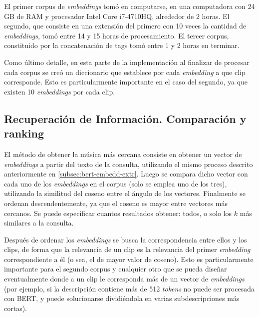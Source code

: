 El primer corpus de \textit{embeddings} tomó en computarse, en una computadora con 24 GB de RAM y procesador Intel Core i7-4710HQ, alrededor de 2 horas. El segundo, que consiste en una extensión del primero con 10 veces la cantidad de \textit{embeddings}, tomó entre 14 y 15 horas de procesamiento. El tercer corpus, constituido por la concatenación de tags tomó entre 1 y 2 horas en terminar.

Como último detalle, en esta parte de la implementación al finalizar de procesar cada corpus se creó un diccionario que establece por cada \textit{embedding} a que clip corresponde. Esto es particularmente importante en el caso del segundo, ya que existen 10 \textit{embeddings} por cada clip.

\subsection{Recuperación de Información. Comparación y ranking}
\label{subsec:IR-process-query}

El método de obtener la música más cercana consiste en obtener un vector de \textit{embeddings} a partir del texto de la consulta, utilizando el mismo proceso descrito anteriormente en  \ref{subsec:bert-embedd-extr}. Luego se compara dicho vector con cada uno de los \textit{embeddings} en el corpus (solo se emplea uno de los tres), utilizando la similitud del coseno entre el ángulo de los vectores. Finalmente se ordenan descendentemente, ya que el coseno es mayor entre vectores más cercanos. Se puede especificar cuantos resultados obtener: todos, o solo los $k$ más similares a la consulta. 

Después de ordenar los \textit{embeddings} se busca la correspondencia entre ellos y los clips, de forma que la relevancia de un clip es la relevancia del primer \textit{embedding} correspondiente a él (o sea, el de mayor valor de coseno). Esto es particularmente importante para el segundo corpus y cualquier otro que se pueda diseñar eventualmente donde a un clip le corresponda más de un vector de \textit{embeddings} (por ejemplo, si la descripción contiene más de 512 \textit{tokens} no puede ser procesada con BERT, y puede solucionarse dividiéndola en varias subdescripciones más cortas).

